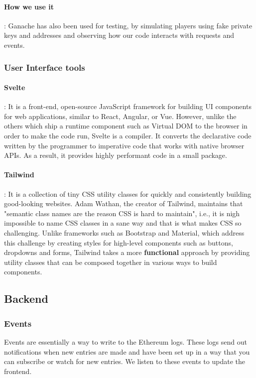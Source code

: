 \documentclass{article}
\begin{document}
\paragraph{How we use it}:
Ganache has also been used for testing, by simulating players using fake private keys and addresses and observing how our code interacts with requests and events.

\subsubsection{User Interface tools} 
    \paragraph{Svelte}: It is a front-end, open-source JavaScript framework  for building UI components for web applications, similar to React, Angular, or Vue. However, unlike the others which ship a runtime component such as Virtual DOM to the browser in order to make the code run, Svelte is a compiler. It converts the declarative code written by the programmer to imperative code that works with native browser APIs. As a result, it provides highly performant code in a small package.

    \paragraph{Tailwind}: It is a collection of tiny CSS utility classes for quickly and consistently building good-looking websites. Adam Wathan, the creator of Tailwind, maintains that "semantic class names are the reason CSS is hard to maintain", i.e., it is nigh impossible to name CSS classes in a sane way and that is what makes CSS so challenging. Unlike frameworks such as Bootstrap and Material, which address this challenge by creating styles for high-level components such as buttons, dropdowns and forms, Tailwind takes a more \textbf{functional} approach by providing utility classes that can be composed together in various ways to build components.

\subsection{Backend}

\subsubsection{Events}
Events are essentially a way to write to the Ethereum logs. These logs send out notifications when new entries are made and have been set up in a way that you can subscribe or watch for new entries.
We listen to these events to update the frontend.
\end{document}
